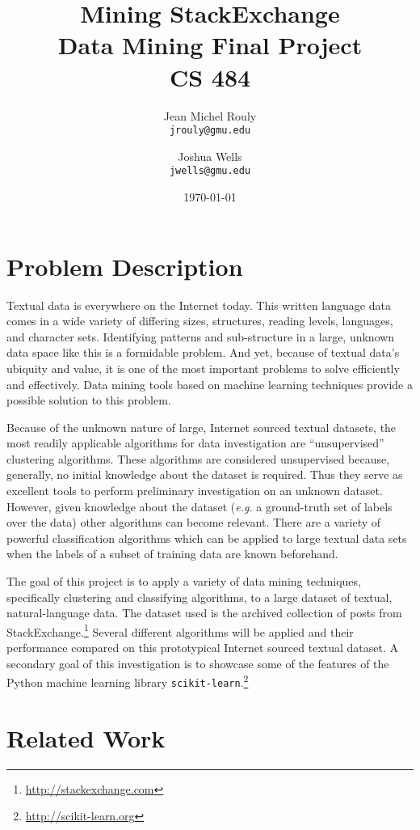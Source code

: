 \documentclass[letterpaper,10pt]{article}
\title{
  \Huge\textbf{Mining StackExchange} \\
  \LARGE Data Mining Final Project \\
  CS 484 \\
}
\author{
  Jean Michel Rouly\\
  \texttt{jrouly@gmu.edu}
  \and
  Joshua Wells\\
  \texttt{jwells@gmu.edu}
}
\date{\today}
\begin{document}
\maketitle


  \section{Problem Description}

  Textual data is everywhere on the Internet today. This written language
  data comes in a wide variety of differing sizes, structures, reading
  levels, languages, and character sets. Identifying patterns and
  sub-structure in a large, unknown data space like this is a formidable
  problem. And yet, because of textual data's ubiquity and value, it is one
  of the most important problems to solve efficiently and effectively. Data
  mining tools based on machine learning techniques provide a possible
  solution to this problem.

  Because of the unknown nature of large, Internet sourced textual
  datasets, the most readily applicable algorithms for data investigation
  are ``unsupervised'' clustering algorithms. These algorithms are
  considered unsupervised because, generally, no initial knowledge about
  the dataset is required. Thus they serve as excellent tools to perform
  preliminary investigation on an unknown dataset. However, given knowledge
  about the dataset (\textit{e.g.} a ground-truth set of labels over the
  data) other algorithms can become relevant. There are a variety of
  powerful classification algorithms which can be applied to large textual
  data sets when the labels of a subset of training data are known
  beforehand.

  The goal of this project is to apply a variety of data mining techniques,
  specifically clustering and classifying algorithms, to a large dataset of
  textual, natural-language data. The dataset used is the archived
  collection of posts from
  StackExchange.\footnote{\url{http://stackexchange.com}} Several different
  algorithms will be applied and their performance compared on this
  prototypical Internet sourced textual dataset. A secondary goal of this
  investigation is to showcase some of the features of the Python machine
  learning library
  \texttt{scikit-learn}.\footnote{\url{http://scikit-learn.org}}


  \section{Related Work}
\end{document}
